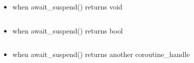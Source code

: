 \documentclass[twoside,twocolumn, 10pt]{article}
\begin{document}
	\begin{itemize}
    \item when await\_suspend() returns void \\ \inputminted[firstline=2, lastline=8]{c++}{code-examples/theory-custom-coroutine/co-await-transformation-suspend.cpp}
    \item when await\_suspend() returns bool \\ \inputminted[firstline=11, lastline=19]{c++}{code-examples/theory-custom-coroutine/co-await-transformation-suspend.cpp}
    \item when await\_suspend() returns another coroutine\_handle \\ \inputminted[firstline=22, lastline=31]{c++}{code-examples/theory-custom-coroutine/co-await-transformation-suspend.cpp}
	
	\end{itemize}
\end{document}
